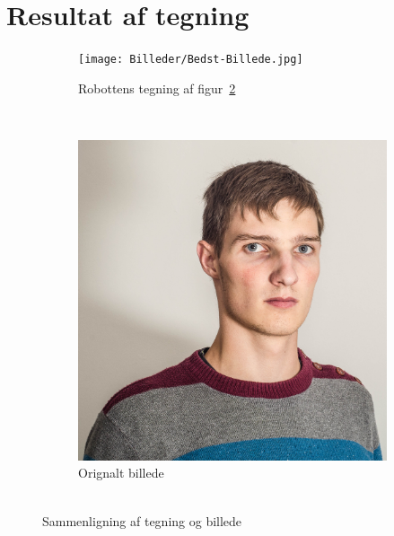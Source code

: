 \section{Resultat af tegning}

\begin{figure}[h]
        \centering
        	\begin{subfigure}[b]{0.3\textwidth}
                	\texttt{[image: Billeder/Bedst-Billede.jpg]}
               		\caption[caption]{Robottens tegning af figur~\ref{fig:Bedst-Billede-Original}}
            	    \label{fig:Bedst-Billede}
       		\end{subfigure}
       		\quad%
        ~ %
       		\begin{subfigure}[b]{0.3\textwidth}
                	\includegraphics[scale=0.045]{Billeder/Bedst-Billede-Original.jpg}
            	    \caption[caption]{Orignalt billede\\
            		\ }
          	      \label{fig:Bedst-Billede-Original}
        	\end{subfigure}
        	\caption[caption]{Sammenligning af tegning og billede}
        	\label{fig:William-med-tre-farver}
\end{figure}

